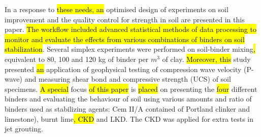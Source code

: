 \documentclass[USenglish,twocolumn]{article}
\begin{document}
In a response to \hl{ these needs, an} optimised design of experiments on soil improvement\hl{ }and the quality control for strength in soil are presented in this paper. \hl{The workflow included advanced statistical methods of data processing to monitor and evaluate the effects from various combinations of binders on soil stabilization}. Several simplex experiments were performed on soil-binder mixing\hl{, }equivalent to 80, 100 and 120 kg of binder per $m^3$ of clay. \hl{Moreover, this } study presented \hl{an} application of geophysical testing of compression wave velocity (P-wave) and measuring\hl{ }shear bond and compressive strength (UCS) of soil specimens. \hl{A special }focus \hl{of this paper} is \hl{placed }on presenting the \hl{four} different binders and evaluating the behaviour of soil using various amounts and ratio of binders used as stabilizing agents: Cem II/A contained of Portland clinker and limestone), burnt lime\hl{, CKD} and LKD. The CKD was applied for extra tests in jet grouting. 
\end{document}

